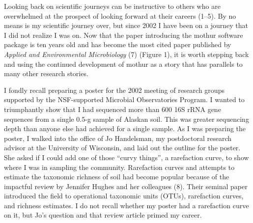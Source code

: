 \documentclass[11pt,]{article}
\begin{document}
\newpage

Looking back on scientific journeys can be instructive to others who are
overwhelmed at the prospect of looking forward at their careers (1--5).
By no means is my scientific journey over, but since 2002 I have been on
a journey that I did not realize I was on. Now that the paper
introducing the mothur software package is ten years old and has become
the most cited paper published by \emph{Applied and Environmental
Microbiology} (7) (Figure 1), it is worth stepping back and using the
continued development of mothur as a story that has parallels to many
other research stories.

I fondly recall preparing a poster for the 2002 meeting of research
groups supported by the NSF-supported Microbial Observatories Program. I
wanted to triumphantly show that I had sequenced more than 600 16S rRNA
gene sequences from a single 0.5-g sample of Alaskan soil. This was
greater sequencing depth than anyone else had achieved for a single
sample. As I was preparing the poster, I walked into the office of Jo
Handelsman, my postdoctoral research advisor at the University of
Wisconsin, and laid out the outline for the poster. She asked if I could
add one of those ``curvy things'', a rarefaction curve, to show where I
was in sampling the community. Rarefaction curves and attempts to
estimate the taxonomic richness of soil had become popular because of
the impactful review by Jennifer Hughes and her colleagues (8). Their
seminal paper introduced the field to operational taxonomic units
(OTUs), rarefaction curves, and richness estimates. I do not recall
whether my poster had a rarefaction curve on it, but Jo's question and
that review article primed my career.
\end{document}
